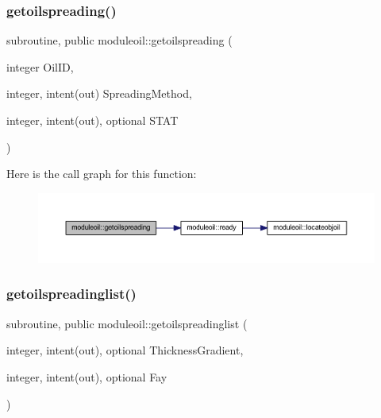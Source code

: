 \subsubsection{\texorpdfstring{getoilspreading()}{getoilspreading()}}
{\footnotesize\ttfamily subroutine, public moduleoil\+::getoilspreading (\begin{DoxyParamCaption}\item[{integer}]{Oil\+ID,  }\item[{integer, intent(out)}]{Spreading\+Method,  }\item[{integer, intent(out), optional}]{S\+T\+AT }\end{DoxyParamCaption})}

Here is the call graph for this function\+:\nopagebreak
\begin{figure}[H]
\begin{center}
\leavevmode
\includegraphics[width=350pt]{namespacemoduleoil_ab0850c594da69306ab36555f8971e6e4_cgraph}
\end{center}
\end{figure}
\mbox{\label{namespacemoduleoil_a4bba14809f66e683d6b93c629e986fc5}} 
\subsubsection{\texorpdfstring{getoilspreadinglist()}{getoilspreadinglist()}}
{\footnotesize\ttfamily subroutine, public moduleoil\+::getoilspreadinglist (\begin{DoxyParamCaption}\item[{integer, intent(out), optional}]{Thickness\+Gradient,  }\item[{integer, intent(out), optional}]{Fay }\end{DoxyParamCaption})}

\mbox{\label{namespacemoduleoil_a110af1cd38e3c7128a98fb3d2bed2fdb}} 
